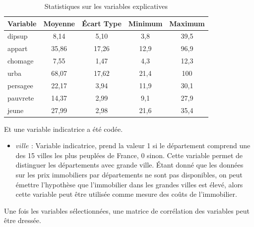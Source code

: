 \documentclass[12pt]{article}
\begin{document}
\begin{table}[H]
    \centering
    \caption{Statistiques sur les variables explicatives}
    \begin{tabular}{l*{1}{|cccc}}
                \toprule
                Variable    &    Moyenne &Écart Type& Minimum&     Maximum\\
                \midrule
                dipsup      &    8,14&    5,10&         3,8&        39,5\\
                appart      &    35,86&    17,26&        12,9&        96,9\\
                chomage     &    7,55&    1,47&         4,3&        12,3\\
                urba        &    68,07&    17,62&        21,4&         100\\
                persagee    &    22,17&    3,94&        11,9&        30,1\\
                pauvrete    &    14,37&    2,99&         9,1&        27,9\\
                jeune       &    27,99&    2,98&        21,6&        35,4\\
                \bottomrule
    \end{tabular}
\end{table}
Et une variable indicatrice a été codée.
\begin{itemize}
    \item $ville$ : Variable indicatrice, prend la valeur 1 si le département comprend une des 15 villes les plus peuplées de France, 0 sinon. Cette variable permet de distinguer les
        départements avec grande ville. Étant donné que les données sur les prix immobiliers par départements ne sont pas disponibles, on peut émettre l'hypothèse que l'immobilier dans
        les grandes villes est élevé, alors cette variable peut être utilisée comme mesure des coûts de l'immobilier.
\end{itemize}
Une fois les variables sélectionnées, une matrice de corrélation des variables peut être dressée.
\end{document}

